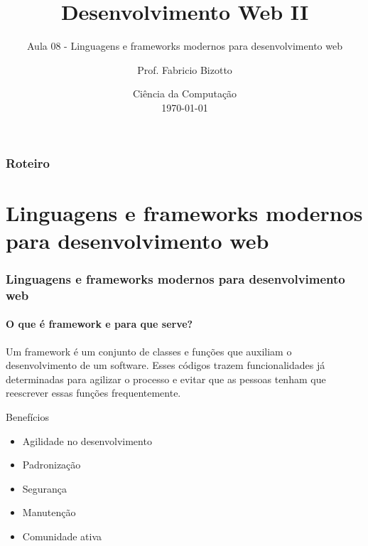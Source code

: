 \documentclass[
	9pt, %
	t, %
]{beamer}
\title[DesWebII]{Desenvolvimento Web II} %
\subtitle{Aula 08 - Linguagens e frameworks modernos para desenvolvimento web} %
\author[Fabricio Bizotto]{Prof. Fabricio Bizotto} %
\institute[IFC]{Instituto Federal Catarinense \\ \smallskip \textit{fabricio.bizotto@ifc.edu.br}} %
\date[\today]{Ciência da Computação \\ \today} %
\begin{document}

\begin{frame}
	\titlepage %
\end{frame}


\begin{frame}
	\frametitle{Roteiro} %
	
	\tableofcontents %
\end{frame}


\section{Linguagens e frameworks modernos para desenvolvimento web}

\begin{frame}
	\frametitle{Linguagens e frameworks modernos para desenvolvimento web}
	\framesubtitle{O que é framework e para que serve?}

	Um framework é um conjunto de classes e funções que auxiliam o desenvolvimento de um software. Esses códigos trazem funcionalidades já determinadas para agilizar o processo e evitar que as pessoas tenham que reescrever essas funções frequentemente.

	\begin{exampleblock}{Benefícios}
		\begin{itemize}
			\item Agilidade no desenvolvimento
			\item Padronização
			\item Segurança
			\item Manutenção
			\item Comunidade ativa
		\end{itemize}
	\end{exampleblock}

\end{frame}
\end{document}
